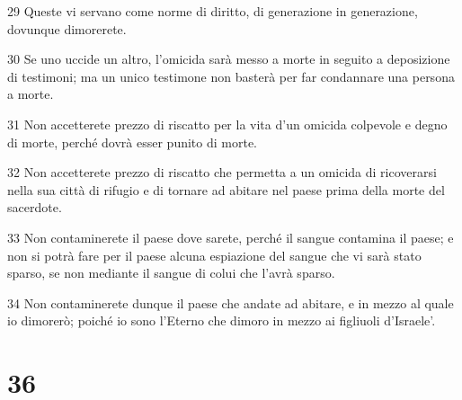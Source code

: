 \par 29 Queste vi servano come norme di diritto, di generazione in generazione, dovunque dimorerete.
\par 30 Se uno uccide un altro, l'omicida sarà messo a morte in seguito a deposizione di testimoni; ma un unico testimone non basterà per far condannare una persona a morte.
\par 31 Non accetterete prezzo di riscatto per la vita d'un omicida colpevole e degno di morte, perché dovrà esser punito di morte.
\par 32 Non accetterete prezzo di riscatto che permetta a un omicida di ricoverarsi nella sua città di rifugio e di tornare ad abitare nel paese prima della morte del sacerdote.
\par 33 Non contaminerete il paese dove sarete, perché il sangue contamina il paese; e non si potrà fare per il paese alcuna espiazione del sangue che vi sarà stato sparso, se non mediante il sangue di colui che l'avrà sparso.
\par 34 Non contaminerete dunque il paese che andate ad abitare, e in mezzo al quale io dimorerò; poiché io sono l'Eterno che dimoro in mezzo ai figliuoli d'Israele'.

\chapter{36}

